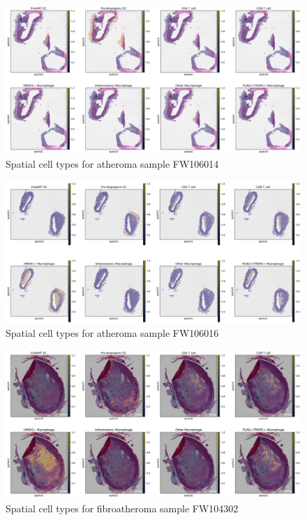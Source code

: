 \documentclass[a4paper,12pt]{article}
\begin{document}
\begin{figure}[h]
    \centering
    \includegraphics[width=1.1\textwidth]{spatialAtheroma4}
    \caption{Spatial cell types for atheroma sample FW106014}
    \label{fig:appendix1}
\end{figure}
\begin{figure}[h]
    \centering
    \includegraphics[width=1.1\textwidth]{spatialAtheroma5}
    \caption{Spatial cell types for atheroma sample FW106016}
    \label{fig:appendix1}
\end{figure}
\begin{figure}[h]
    \centering
    \includegraphics[width=1.1\textwidth]{spatialFibroatheroma1}
    \caption{Spatial cell types for fibroatheroma sample FW104302}
    \label{fig:appendix1}
\end{figure}
\end{document}
